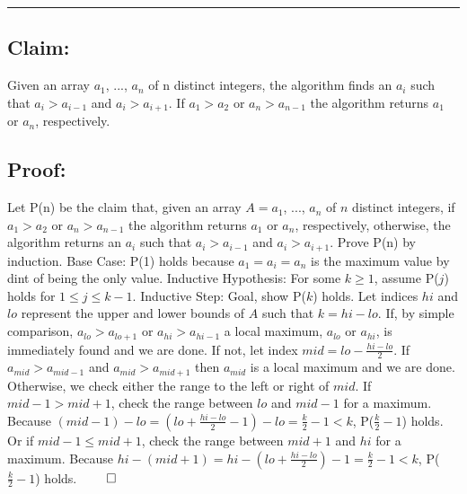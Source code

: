\documentclass[11pt]{article}
\begin{document}
\noindent\textcolor[RGB]{220,220,220}{\rule{\linewidth}{0.8pt}}

\subsection*{Claim:} 

Given an array $a_1$, ..., $a_n$ of n distinct integers, the algorithm finds an $a_i$ such that $a_i > a_{i-1}$ and $a_i > a_{i+1}$. If $a_1 > a_2$ or $a_n > a_{n-1}$ the algorithm returns $a_1$ or $a_n$, respectively.

\subsection*{Proof:} 
Let P(n) be the claim that, given an array $A = a_1$, ..., $a_n$ of $n$ distinct integers, if $a_1 > a_2$ or $a_n > a_{n-1}$ the algorithm returns $a_1$ or $a_n$, respectively, otherwise, the algorithm returns an $a_i$ such that $a_i > a_{i-1}$ and $a_i > a_{i+1}$. Prove P(n) by induction.
\newline\newline
Base Case: P(1) holds because $a_1 = a_i = a_n$ is the maximum value by dint of being the only value. 
\newline\newline
Inductive Hypothesis: For some $k \geq 1$, assume P($j$) holds for $1 \leq j \leq k-1$.
\newline\newline
Inductive Step: Goal, show P($k$) holds. 
Let indices $hi$ and $lo$ represent the upper and lower bounds of $A$ such that $k = hi - lo$. If, by simple comparison, $a_{lo} > a_{lo + 1}$ or $a_{hi} > a_{hi - 1}$ a local maximum, $a_{lo}$ or $a_{hi}$, is immediately found and we are done. If not, let index $mid = lo - \frac{hi - lo}{2}$. If $a_{mid} > a_{mid - 1}$ and $a_{mid} > a_{mid + 1}$ then $a_{mid}$ is a local maximum and we are done. Otherwise, we check either the range to the left or right of $mid$. If $mid - 1 > mid + 1$, check the range between $lo$ and $mid - 1$ for a maximum. Because $(mid - 1) - lo = (lo + \frac{hi - lo}{2} - 1) - lo = \frac{k}{2} - 1 < k$, P($\frac{k}{2} - 1$) holds. Or if $mid - 1 \leq mid + 1$, check the range between $mid + 1$ and $hi$ for a maximum. Because $hi - (mid + 1) = hi - (lo + \frac{hi - lo}{2}) - 1 = \frac{k}{2} - 1 < k$, P($\frac{k}{2} - 1$) holds. $\qed$
\end{document}
